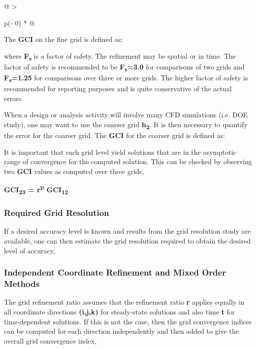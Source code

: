 \begin{longtable}[]{@{}
  >{\raggedright\arraybackslash}p{(\columnwidth - 0\tabcolsep) * }@{}}
\begin{minipage}[t]{\linewidth}
The \textbf{GCI} on the fine grid is defined as:


where \textbf{F\textsubscript{s}} is a factor of safety. The refinement
may be spatial or in time. The factor of safety is recommended to be
\textbf{F\textsubscript{s}=3.0} for comparisons of two grids and
\textbf{F\textsubscript{s}=1.25} for comparisons over three or more
grids. The higher factor of safety is recommended for reporting purposes
and is quite conservative of the actual errors.

When a design or analysis activity will involve many CFD simulations
(i.e. DOE study), one may want to use the coarser grid
\textbf{h\textsubscript{2}}. It is then necessary to quantify the error
for the coarser grid. The \textbf{GCI} for the coarser grid is defined
as:


It is important that each grid level yield solutions that are in the
asymptotic range of convergence for the computed solution. This can be
checked by observing two \textbf{GCI} values as computed over three
grids,

\textbf{GCI\textsubscript{23} = r\textsuperscript{p}
GCI\textsubscript{12}}

\hypertarget{required-grid-resolution}{%
\subsubsection{Required Grid
Resolution}\label{required-grid-resolution}}

If a desired accuracy level is known and results from the grid
resolution study are available, one can then estimate the grid
resolution required to obtain the desired level of accuracy,


\hypertarget{independent-coordinate-refinement-and-mixed-order-methods}{%
\subsubsection{Independent Coordinate Refinement and Mixed Order
Methods}\label{independent-coordinate-refinement-and-mixed-order-methods}}

The grid refinement ratio assumes that the refinement ratio \textbf{r}
applies equally in all coordinate directions \textbf{(i,j,k)} for
steady-state solutions and also time \textbf{t} for time-dependent
solutions. If this is not the case, then the grid convergence indices
can be computed for each direction independently and then added to give
the overall grid convergence index,


\end{minipage}
\end{longtable}
